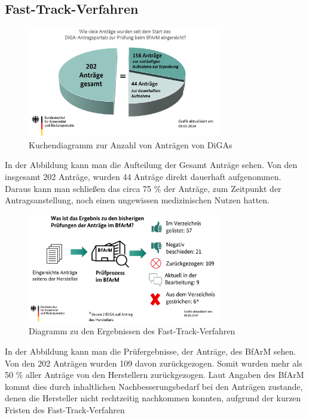 \documentclass{article}
\begin{document}
		\subsection{Fast-Track-Verfahren} 
			\begin{figure}[htbp]
				\centering
				\includegraphics[width=0.75\textwidth]{./grafiken/Anzahl_Antraege_DiGA}
				\caption[Anzahl Anträge von DiGAs]{Kuchendiagramm zur Anzahl von Anträgen von DiGAs}
				\label{Abb-antragsanzahl-diga}
			\end{figure}
			In der Abbildung kann man die Aufteilung der Gesamt Anträge sehen. Von den insgesamt 202 Anträge, wurden 44 Anträge direkt dauerhaft aufgenommen. Daraus kann man schließen das circa 75 \% der Anträge, zum Zeitpunkt der Antragsanstellung, noch einen ungewissen medizinischen Nutzen hatten.
		
			\begin{figure}[htbp]
				\centering
				\includegraphics[width=0.75\textwidth]{./grafiken/Ergebnis_Pruefungen_DiGA}
				\caption[Abbildung zu den Ergebnissen des Fast-Track-Verfahren]{Diagramm zu den Ergebnissen des Fast-Track-Verfahren}
				\label{Abb-ergebnisse-ft}
			\end{figure} 
			In der Abbildung kann man die Prüfergebnisse, der Anträge, des BfArM sehen. Von den 202 Anträgen wurden 109 davon zurückgezogen. Somit wurden mehr als 50 \% aller Anträge von den Herstellern zurückgezogen. Laut Angaben des BfArM kommt dies durch inhaltlichen Nachbesserungsbedarf bei den Anträgen zustande, denen die Hersteller nicht rechtzeitig nachkommen konnten, aufgrund der kurzen Fristen des Fast-Track-Verfahren\cite[vgl. Z. 37]{tipps-diga-antragsansteller} 
			
\end{document}
